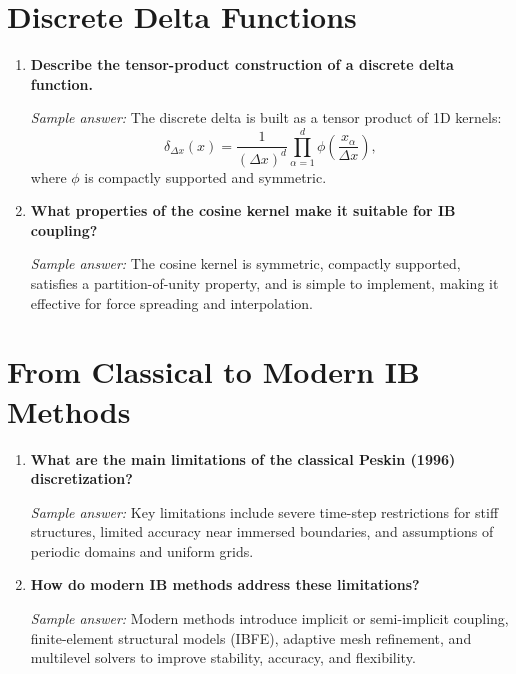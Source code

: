 \documentclass[11pt]{article}
\begin{document}
\section*{Discrete Delta Functions}

\begin{enumerate}[label=\arabic*., resume]

\item \textbf{Describe the tensor-product construction of a discrete delta function.}

\textit{Sample answer:}  
The discrete delta is built as a tensor product of 1D kernels:
\[
\delta_{\Delta x}(x) = \frac{1}{(\Delta x)^d}\prod_{\alpha=1}^d \phi\left(\frac{x_\alpha}{\Delta x}\right),
\]
where $\phi$ is compactly supported and symmetric.

\item \textbf{What properties of the cosine kernel make it suitable for IB coupling?}

\textit{Sample answer:}  
The cosine kernel is symmetric, compactly supported, satisfies a partition-of-unity property, and is simple to implement, making it effective for force spreading and interpolation.

\end{enumerate}

\section*{From Classical to Modern IB Methods}

\begin{enumerate}[label=\arabic*., resume]

\item \textbf{What are the main limitations of the classical Peskin (1996) discretization?}

\textit{Sample answer:}  
Key limitations include severe time-step restrictions for stiff structures, limited accuracy near immersed boundaries, and assumptions of periodic domains and uniform grids.

\item \textbf{How do modern IB methods address these limitations?}

\textit{Sample answer:}  
Modern methods introduce implicit or semi-implicit coupling, finite-element structural models (IBFE), adaptive mesh refinement, and multilevel solvers to improve stability, accuracy, and flexibility.

\end{enumerate}
\end{document}
